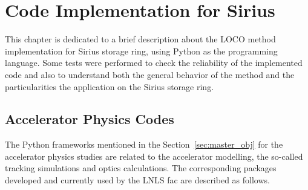 \chapter{Code Implementation for Sirius}
This chapter is dedicated to a brief description about the LOCO method implementation for Sirius storage ring, using Python as the programming language. Some tests were performed to check the reliability of the implemented code and also to understand both the general behavior of the method and the particularities the application on the Sirius storage ring.
\section{Accelerator Physics Codes}
The Python frameworks mentioned in the Section~\ref{sec:master_obj} for the accelerator physics studies are related to the accelerator modelling, the so-called tracking simulations and optics calculations. The corresponding packages developed and currently used by the LNLS \gls{fac} are described as follows.

